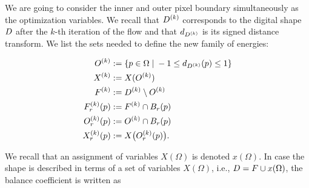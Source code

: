 %
%
%
%
%
%
%



We are going to consider the inner and outer pixel boundary simultaneously as the optimization variables. We recall that $D^{(k)}$ corresponds to the digital shape $D$ after the $k$-th iteration of the flow and that $d_{D^{(k)}}$ is its signed distance transform. We list the sets needed to define the new family of energies:

\begin{align*}
	O^{(k)} &:=\left\{ p \in \Omega \; | \; -1 \leq d_{D^{(k)}}(p) \leq 1 \right\}\\
	X^{(k)} &:= X(O^{(k)})  \\
	F^{(k)} &:= D^{(k)} \setminus O^{(k)} \\
	F_r^{(k)}(p) &:= F^{(k)} \cap B_r(p)\\
	O_r^{(k)}(p) &:= O^{(k)} \cap B_r(p) \\
	X_r^{(k)}(p) &:= X\big( O_r^{(k)}(p) \big).
\end{align*}

We recall that an assignment of variables $X(\Omega)$ is denoted $x(\Omega)$. In case the shape is described in terms of a set of variables $X(\Omega)$, i.e., $D=F \cup x(\Omega)$,  the balance coefficient is written as

